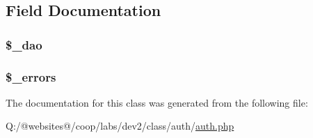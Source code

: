 \subsection{Field Documentation}
\hypertarget{class_xortify_auth_a12a029c610f699b4b25e79a1f64a3485}{
\subsubsection[{\$\-\_\-dao}]{\setlength{\rightskip}{0pt plus 5cm}\$\-\_\-dao}}\label{class_xortify_auth_a12a029c610f699b4b25e79a1f64a3485}
\hypertarget{class_xortify_auth_a09272cb16edd572f760a622f37cee6d1}{
\subsubsection[{\$\-\_\-errors}]{\setlength{\rightskip}{0pt plus 5cm}\$\-\_\-errors}}\label{class_xortify_auth_a09272cb16edd572f760a622f37cee6d1}


The documentation for this class was generated from the following file\-:\begin{DoxyCompactItemize}
\item 
Q\-:/@websites@/coop/labs/dev2/class/auth/\hyperlink{auth_8php}{auth.\-php}\end{DoxyCompactItemize}
